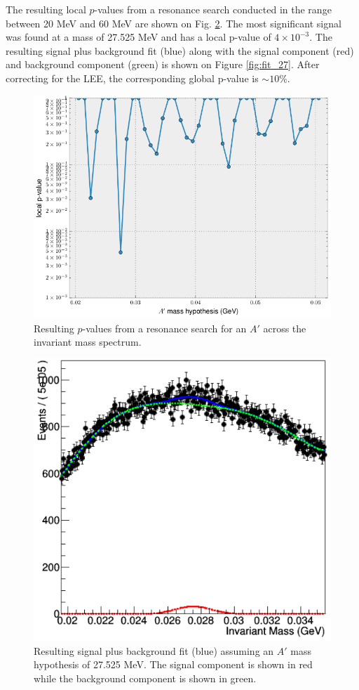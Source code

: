 The resulting local $p$-values from a resonance search conducted in the range 
between 20 MeV and 60 MeV are shown on Fig. \ref{fig:local_p_values}. 
The most significant signal
was found at a mass of 27.525 MeV and has a local p-value of $4 \times 10^{-3}$.
The resulting signal plus background fit (blue) along with the signal component 
(red) and background component (green) is shown on Figure \ref{fig:fit_27}.
After correcting for the LEE, the corresponding global p-value is 
$\sim 10\%$.
\begin{figure}[t]
    \centering
    \includegraphics[width=\textwidth]{images/final_p_values.png}
    \caption{Resulting $p$-values from a resonance search for an $A'$ across the
    invariant mass spectrum.}
    \label{fig:local_p_values}
\end{figure}

\begin{figure}[ht]
    \centering
    \includegraphics[width=.6\textwidth]{images/fit27.png}
    \caption{Resulting signal plus background fit (blue) assuming an $A'$ mass hypothesis
             of 27.525 MeV.  The signal component is shown in red while the 
         background component is shown in green.}
        
    \label{fig:local_p_values}
\end{figure}

